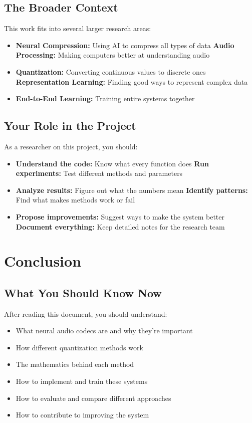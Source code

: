 \documentclass[12pt]{article}
\begin{document}
\subsection{The Broader Context}

This work fits into several larger research areas:
\begin{itemize}
    \item \textbf{Neural Compression:} Using AI to compress all types of data
    \textbf{Audio Processing:} Making computers better at understanding audio
    \item \textbf{Quantization:} Converting continuous values to discrete ones
    \textbf{Representation Learning:} Finding good ways to represent complex data
    \item \textbf{End-to-End Learning:} Training entire systems together
\end{itemize}

\subsection{Your Role in the Project}

As a researcher on this project, you should:
\begin{itemize}
    \item \textbf{Understand the code:} Know what every function does
    \textbf{Run experiments:} Test different methods and parameters
    \item \textbf{Analyze results:} Figure out what the numbers mean
    \textbf{Identify patterns:} Find what makes methods work or fail
    \item \textbf{Propose improvements:} Suggest ways to make the system better
    \textbf{Document everything:} Keep detailed notes for the research team
\end{itemize}

\section{Conclusion}

\subsection{What You Should Know Now}

After reading this document, you should understand:
\begin{itemize}
    \item What neural audio codecs are and why they're important
    \item How different quantization methods work
    \item The mathematics behind each method
    \item How to implement and train these systems
    \item How to evaluate and compare different approaches
    \item How to contribute to improving the system
\end{itemize}
\end{document}
